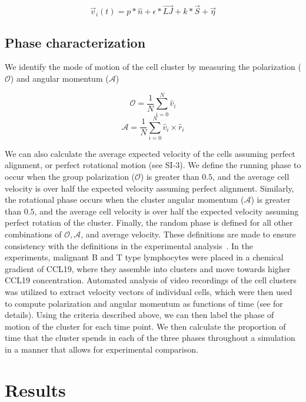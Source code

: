 \documentclass{article}
\begin{document}
 \begin{equation}
\vec{v}_i(t) = p * \hat{n}+\epsilon*\vec{LJ}+k*\vec{S}+ \vec{\eta}
\label{vel}
\end{equation}

\subsection*{Phase characterization}

We identify the mode of motion of the cell cluster by measuring the polarization ($\mathcal{O}$) and angular momentum ($\mathcal{A}$) 

\begin{equation}
\mathcal{O}=\frac{1}{N} \sum_{i=0}^N \hat{v}_i
\label{order}
\end{equation}
\begin{displaymath}
\mathcal{A}=\frac{1}{N}\sum_{i=0}^N \hat{v}_i \times \hat{r}_i
\end{displaymath}

We can also calculate the average expected velocity of the cells assuming perfect alignment, or perfect rotational motion (see SI-3).  We define the running phase to occur when the group polarization ($\mathcal{O}$) is greater than $0.5$, and the average cell velocity is over half the expected velocity assuming perfect alignment.  Similarly, the rotational phase occurs when the cluster angular momentum ($\mathcal{A}$) is greater than $0.5$, and the average cell velocity is over half the expected velocity assuming perfect rotation of the cluster.  Finally, the random phase is defined for all other combinations of $\mathcal{O}, \mathcal{A}$, and average velocity. These definitions are made to ensure consistency with the definitions in the experimental analysis~\cite{Malet-Engra2014}.  In the experiments, malignant B and T type lymphocytes were placed in a chemical gradient of CCL19, where they assemble into clusters and move towards higher CCL19 concentration. Automated analysis of video recordings of the cell clusters was utilized to extract velocity vectors of individual cells, which were then used to compute polarization and angular momentum as functions of time (see \cite{Malet-Engra2014} for details). Using the criteria described above, we can then label the phase of motion of the cluster for each time point. We then calculate the proportion of time that the cluster spends in each of the three phases throughout a simulation in a manner that allows for experimental comparison. 

\section*{Results}
\end{document}
